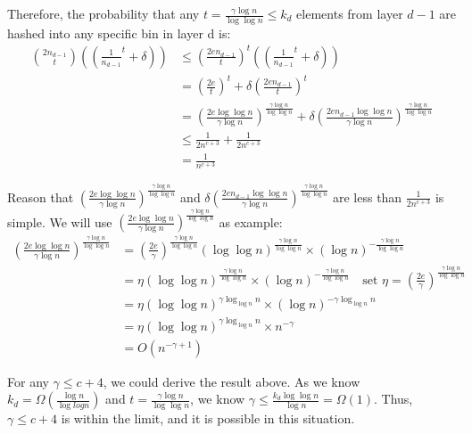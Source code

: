 \documentclass[a4paper, english]{paper}
\begin{document}
Therefore, the probability that any $t = \frac{\gamma\log n}{\log \log n}\le k_d$ elements from layer $d-1$ are hashed into any specific bin in layer d is:
\begin{align*}
{2n_{d-1}\choose t} \left((\frac1{n_{d-1}}^t+\delta)\right)&\le (\frac{2en_{d-1}}{t})^t\left((\frac1{n_{d-1}}^t+\delta)\right)\\
& = (\frac{2e}t)^t+\delta\left( \frac{2en_{d-1}}{t}\right)^t\\
& = (\frac{2e\log\log n}{\gamma\log n})^{\frac{\gamma\log n}{\log \log n}}+\delta\left( \frac{2en_{d-1}\log\log n}{\gamma\log n}\right)^{\frac{\gamma\log n}{\log \log n}}\\
& \le \frac1{2n^{c+3}}+\frac1{2n^{c+3}}\\
& = \frac1{n^{c+3}}
\end{align*}\par
Reason that $(\frac{2e\log\log n}{\gamma\log n})^{\frac{\gamma\log n}{\log \log n}}$ and $\delta\left( \frac{2en_{d-1}\log\log n}{\gamma\log n}\right)^{\frac{\gamma\log n}{\log \log n}}$ are less than $\frac1{2n^{c+3}}$ is simple. We will use $(\frac{2e\log\log n}{\gamma\log n})^{\frac{\gamma\log n}{\log \log n}}$ as example:
\begin{align*}
(\frac{2e\log\log n}{\gamma\log n})^{\frac{\gamma\log n}{\log \log n}} &= (\frac{2e}{\gamma})^{\frac{\gamma\log n}{\log \log n}}(\log\log n)^{\frac{\gamma\log n}{\log \log n}}\times(\log n)^{-\frac{\gamma\log n}{\log \log n}}\\
&= \eta(\log\log n)^{\frac{\gamma\log n}{\log \log n}}\times(\log n)^{-\frac{\gamma\log n}{\log \log n}}\quad\text{set }\eta=(\frac{2e}{\gamma})^{\frac{\gamma\log n}{\log \log n}}\\
&=\eta (\log\log n)^{\gamma\log_{\log n} n}\times(\log n)^{-\gamma\log_{\log n} n}\\
&= \eta (\log\log n)^{\gamma\log_{\log n} n}\times n^{-\gamma}\\
&= O(n^{-\gamma+1})
\end{align*}\par
 For any $\gamma\le c+4$, we could derive the result above. As we know $k_d = \Omega(\frac{\log n}{\log log n})$ and $t = \frac{\gamma\log n}{\log\log n}$, we know $\gamma\le \frac{k_d\log\log n}{\log n} = \Omega(1)$. Thus, $\gamma\le c+4$ is within the limit, and it is possible in this situation.\\
\end{document}
